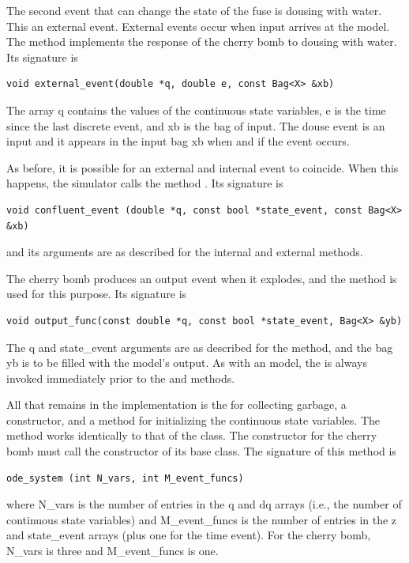 The second event that can change the state of the fuse is dousing with water. This an external event. External events occur when input arrives at the model. The  method implements the response of the cherry bomb to dousing with water. Its signature is
\begin{verbatim}
void external_event(double *q, double e, const Bag<X> &xb)
\end{verbatim}
The array q contains the values of the continuous state variables, e is the time since the last discrete event, and xb is the bag of input. The douse event is an input and it appears in the input bag xb when and if the event occurs. 

As before, it is possible for an external and internal event to coincide. When this happens, the simulator calls the method . Its signature is
\begin{verbatim}
void confluent_event (double *q, const bool *state_event, const Bag<X> &xb)
\end{verbatim}
and its arguments are as described for the internal and external methods.

The cherry bomb produces an output event when it explodes, and the  method is used for this purpose. Its signature is
\begin{verbatim}
void output_func(const double *q, const bool *state_event, Bag<X> &yb)
\end{verbatim}
The q and state\_event arguments are as described for the  method, and the bag yb is to be filled with the model's output. As with an  model, the  is always invoked immediately prior to the  and  methods.

All that remains in the implementation is the  for collecting garbage, a constructor, and a method for initializing the continuous state variables. The  method works identically to that of the  class. The constructor for the cherry bomb must call the constructor of its  base class. The signature of this method is
\begin{verbatim}
ode_system (int N_vars, int M_event_funcs)
\end{verbatim}
where N\_vars is the number of entries in the q and dq arrays (i.e., the number of continuous state variables) and M\_event\_funcs is the number of entries in the z and state\_event arrays (plus one for the time event). For the cherry bomb, N\_vars is three and M\_event\_funcs is one.

